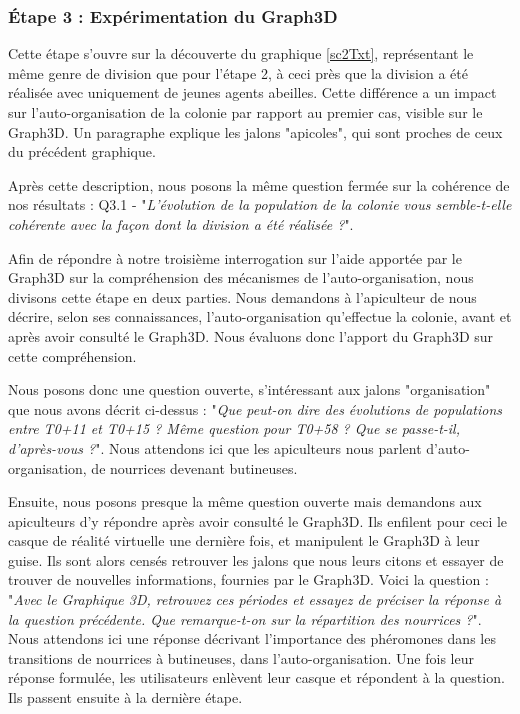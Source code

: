		\subsubsection{Étape 3 : Expérimentation du Graph3D}
			Cette étape s'ouvre sur la découverte du graphique \ref{sc2Txt}, représentant le même genre de division que pour l'étape 2, à ceci près que la division a été réalisée avec uniquement de jeunes agents abeilles. Cette différence a un impact sur l'auto-organisation de la colonie par rapport au premier cas, visible sur le Graph3D. Un paragraphe explique les jalons "apicoles", qui sont proches de ceux du précédent graphique.
			
			Après cette description, nous posons la même question fermée sur la cohérence de nos résultats : Q3.1 - "\textit{L'évolution de la population de la colonie vous semble-t-elle cohérente avec la façon dont la division a été réalisée ?}".
			
			Afin de répondre à notre troisième interrogation sur l'aide apportée par le Graph3D sur la compréhension des mécanismes de l'auto-organisation, nous divisons cette étape en deux parties. Nous demandons à l'apiculteur de nous décrire, selon ses connaissances, l'auto-organisation qu'effectue la colonie, avant et après avoir consulté le Graph3D. Nous évaluons donc l'apport du Graph3D sur cette compréhension.
			
			Nous posons donc une question ouverte, s'intéressant aux jalons "organisation" que nous avons décrit ci-dessus : "\textit{Que peut-on dire des évolutions de populations entre T0+11 et T0+15 ? Même question pour T0+58 ? Que se passe-t-il, d'après-vous ?}". Nous attendons ici que les apiculteurs nous parlent d'auto-organisation, de nourrices devenant butineuses.
			
			Ensuite, nous posons presque la même question ouverte mais demandons aux apiculteurs d'y répondre après avoir consulté le Graph3D. Ils enfilent pour ceci le casque de réalité virtuelle une dernière fois, et manipulent le Graph3D à leur guise. Ils sont alors censés retrouver les jalons que nous leurs citons et essayer de trouver de nouvelles informations, fournies par le Graph3D. Voici la question : "\textit{Avec le Graphique 3D, retrouvez ces périodes et essayez de préciser la réponse à la question précédente. Que remarque-t-on sur la répartition des nourrices ?}". Nous attendons ici une réponse décrivant l'importance des phéromones dans les transitions de nourrices à butineuses, dans l'auto-organisation. Une fois leur réponse formulée, les utilisateurs enlèvent leur casque et répondent à la question. Ils passent ensuite à la dernière étape.
			
